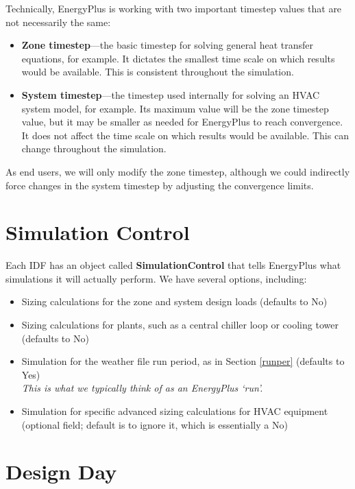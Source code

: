 \documentclass[10pt]{article}
\begin{document}
Technically, EnergyPlus is working with two important timestep values that are not necessarily the same:

\begin{itemize}
    \item \textbf{Zone timestep}---the basic timestep for solving general heat  transfer equations, for example. It dictates the smallest time scale on which results would be available. This is consistent throughout the simulation.
        \item \textbf{System timestep}---the timestep used internally for solving an HVAC system model, for example. Its maximum value will be the zone timestep value, but it may be smaller as needed for EnergyPlus to reach convergence. It does not affect the time scale on which results would be available. This can change throughout the simulation.
\end{itemize}

As end users, we will only modify the zone timestep, although we could indirectly force changes in the system timestep by adjusting the convergence limits.

\section{Simulation Control}

Each IDF has an object called \textbf{SimulationControl} that tells EnergyPlus what simulations it will actually perform. We have several options, including:

\begin{itemize}
    \item Sizing calculations for the zone and system design loads (defaults to No)
    \item Sizing calculations for plants, such as a central chiller loop or cooling tower (defaults to No)
    \item Simulation for the weather file run period, as in Section \ref{runper} (defaults to Yes)\\
\textit{    This is what we typically think of as an EnergyPlus `run'.}
    \item Simulation for specific advanced sizing calculations for HVAC equipment {\color{blue}(optional field; default is to ignore it, which is essentially a No)}
\end{itemize}

\section{Design Day}
\end{document}
